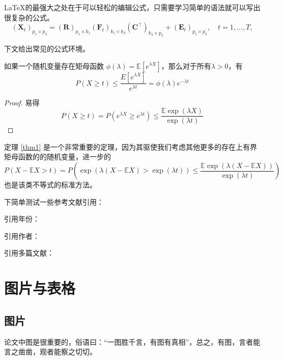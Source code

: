 \documentclass{NauThesis}
\begin{document}
\LaTeX 的最强大之处在于可以轻松的编辑公式，只需要学习简单的语法就可以写出很复杂的公式。
\begin{equation} \label{mfm}
	\left(\mathbf{X}_t\right)_{p_1 \times p_2}=(\mathbf{R})_{p_1 \times k_1}\left(\mathbf{F}_t\right)_{k_1 \times k_2}\left(\mathbf{C}^{\top}\right)_{k_2 \times p_2}+\left(\mathbf{E}_t\right)_{p_1 \times p_2}, \quad t=1, \ldots, T,
\end{equation}

下文给出常见的公式环境。

\begin{theorem}[由矩母函数导出的不等式] \label{thm1}
	如果一个随机变量存在矩母函数 $\phi(\lambda)=\mathbb{E}\left[e^{\lambda X}\right]$，那么对于所有$\lambda>0$，有
	\begin{equation}
		P(X \geq t) \leq \frac{E\left[e^{\lambda X}\right]}{e^{\lambda t}}=\phi(\lambda) e^{-\lambda t}
	\end{equation}
	
\end{theorem}
\begin{proof}
	易得
	\begin{equation}
		P(X \geq t)=P\left(e^{\lambda X} \geq e^{\lambda t}\right) \leq \frac{\mathbb{E} \exp (\lambda X)}{\exp (\lambda t)}
	\end{equation}
\end{proof}

\begin{remark}
	定理 \ref{thm1} 是一个非常重要的定理，因为其驱使我们考虑其他更多的存在上有界矩母函数的的随机变量，进一步的
	\begin{equation}
		P(X-\mathbb{E} X>t)=P\left(\exp (\lambda(X-\mathbb{E} X)>\exp (\lambda t)) \leq \frac{\mathbb{E} \exp (\lambda(X-\mathbb{E} X))}{\exp (\lambda t)}\right)
	\end{equation}
	也是该类不等式的标准方法。
\end{remark}

下简单测试一些参考文献引用：

引用年份：\citet{__2006}

引用作者：\citep{tsui_multidimensional_1995}

引用多篇文献：\citep{_20132018_2021,__2006,maasoumi_measurement_1986,kolm_multidimensional_1977}

\chapter{图片与表格}
\section{图片}
论文中图是很重要的，俗语曰：“一图胜千言，有图有真相”，总之，有图，言者能言之凿凿，观者能察之切切。
\end{document}
